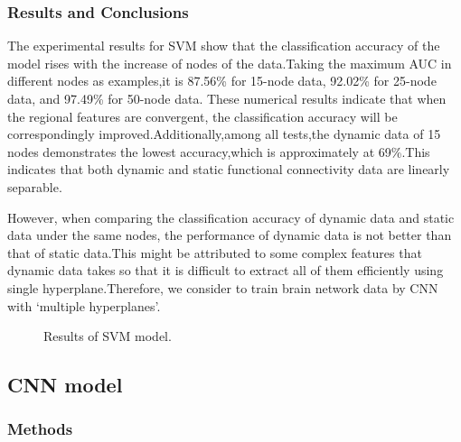 \documentclass[11pt]{article}
\begin{document}
\subsubsection{Results and Conclusions}

The experimental results for SVM show that the classification accuracy of the model rises with the increase of nodes of the data.Taking the maximum AUC in different nodes as examples,it is 87.56\% for 15-node data, 92.02\% for 25-node data, and 97.49\% for 50-node data. These numerical results indicate that when the regional features are convergent, the classification accuracy will be correspondingly improved.Additionally,among all tests,the dynamic data of 15 nodes demonstrates the lowest accuracy,which is approximately at 69\%.This indicates that both dynamic and static functional connectivity data are linearly separable.

However, when comparing the classification accuracy of dynamic data and static data under the same nodes, the performance of dynamic data is not better than that of static data.This might be attributed to some complex features that dynamic data takes so that it is difficult to extract all of them efficiently using single hyperplane.Therefore, we consider to train brain network data by CNN with ‘multiple hyperplanes’.

\begin{figure}[H]
    \centering
    \caption{Results of SVM model.}
    \label{svm-results}
\end{figure}

\subsection{CNN model}

\subsubsection{Methods}
\end{document}
